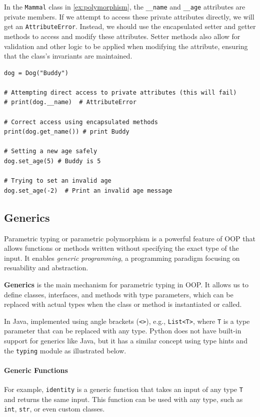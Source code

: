 \documentclass[oneside,11pt,dvipsnames]{book}
\newcommand{\code}[1]{\texttt{#1}}
\begin{document}
In the \code{Mammal} class in \autoref{ex:polymorphism}, the \code{\_\_name} and \code{\_\_age} attributes are private members. If we attempt to access these private attributes directly, we will get an \code{AttributeError}. Instead, we should use the encapsulated setter and getter methods to access and modify these attributes. Setter methods also allow for validation and other logic to be applied when modifying the attribute, ensuring that the class's invariants are maintained.

\begin{lstlisting}
dog = Dog("Buddy")

# Attempting direct access to private attributes (this will fail)
# print(dog.__name)  # AttributeError

# Correct access using encapsulated methods
print(dog.get_name()) # print Buddy

# Setting a new age safely
dog.set_age(5) # Buddy is 5

# Trying to set an invalid age
dog.set_age(-2)  # Print an invalid age message

\end{lstlisting}

\subsection{Generics}\label{sec:generics}
Parametric typing or parametric polymorphism is a powerful feature of OOP that allows functions or methods written without specifying the exact type of the input.  It enables \emph{generic programming}, a programming paradigm focusing on resuability and abstraction. 

\textbf{Generics} is the main mechanism for parametric typing in OOP. It allows us to define classes, interfaces, and methods with type parameters, which can be replaced with actual types when the class or method is instantiated or called. 

In Java, implemented using angle brackets (\texttt{<>}), e.g., \texttt{List<T>}, where \texttt{T} is a type parameter that can be replaced with any type.  Python does not have built-in support for generics like Java, but it has a similar concept using type hints and the \texttt{typing} module as illustrated below.

\paragraph{Generic Functions} For example, \code{identity} is a generic function that takes an input of any type \code{T} and returns the same input. This function can be used with any type, such as \code{int}, \code{str}, or even custom classes.
\end{document}
